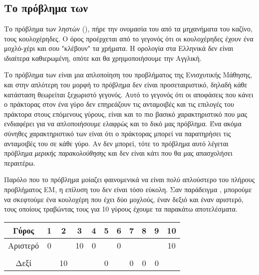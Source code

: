\chapter{}
\section{Το πρόβλημα των }

Το πρόβλημα των ληστών (), πήρε την ονομασία του από τα μηχανήματα του καζίνο, τους κουλοχέρηδες. Ο όρος  προέρχεται από το γεγονός ότι οι κουλοχέρηδες έχουν ένα μοχλό-χέρι και σου "κλέβουν" τα χρήματα. Η ορολογία στα Ελληνικά δεν είναι ιδιαίτερα καθιερωμένη, οπότε και θα χρηιμοποιήσουμε την Αγγλική. 

Το πρόβλημα των  είναι μια απλοποίηση του προβλήματος της Ενισχυτικής Μάθησης, και στην απλότερη του μορφή το πρόβλημα δεν είναι προσεταιριστικό, δηλαδή κάθε κατάσταση θεωρείται ξεχωριστό γεγονός. Αυτό το γεγονός ότι οι αποφάσεις που κάνει ο πράκτορας στον ένα γύρο δεν επηρεάζουν τις ανταμοιβές και τις επιλογές του πράκτορα στους επόμενους γύρους, είναι και το πιο βασικό χαρακτηριστικό που μας ενδιαφέρει για να απλοποιήσουμε ελαφρώς και το δικό μας πρόβλημα. Ένα ακόμα σύνηθες χαρακτηριστικό των  είναι ότι ο πράκτορας μπορεί να παρατηρήσει τις ανταμοιβές του σε κάθε γύρο. Αν δεν μπορεί, τότε το πρόβλημα αυτό λέγεται πρόβλημα \textit{μερικής παρακολούθησης} και δεν είναι κάτι που θα μας απασχολήσει περαιτέρω.

Παρόλο που το πρόβλημα μοίαζει φαινομενικά να είναι πολύ απλούστερο του πλήρους προβλήματος ΕΜ, η επίλυση του δεν είναι τόσο εύκολη. Σαν παράδειγμα \cite{lattimore2020bandit}, μπορούμε να σκεφτούμε ένα κουλοχέρη που έχει δύο μοχλούς, έναν δεξιό και έναν αριστερό, τους οποίους τραβώντας τους για 10 γύρους έχουμε τα παρακάτω αποτελέσματα.

\begin{center}
    \begin{tabular}{ccccccccccc}
        \hline
         Γύρος     & 1 & 2  & 3  & 4 & 5 & 6 & 7 & 8 & 9 & 10 \\
         \hline
         Αριστερό & 0 &    & 10 & 0 &   & 0 &   &   &   & 10  \\ \\
         Δεξί     &   & 10 &    &   & 0 &   & 0 & 0 & 0 &     \\
         \hline
    \end{tabular}
\end{center}

